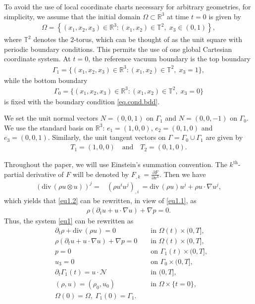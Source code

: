 \documentclass[12pt,twoside,reqno]{amsart}
\numberwithin{equation}{section}
\theoremstyle{definition}
\theoremstyle{remark}
\begin{document}
To avoid the use of local coordinate charts necessary for arbitrary geometries, for simplicity, we assume that the initial domain $\Omega\subset {\mathbb R}^3$ at time $t=0$ is given by
\begin{align*}
  \Omega=\left\{(x_1,x_2,x_3)\in{\mathbb R}^3 : (x_1,x_2)\in\mathbb{T}^2,\; x_3\in(0,1)\right\},
\end{align*}
where $\mathbb{T}^2$ denotes the $2$-torus, which can be thought of as the unit square with periodic boundary conditions. This permits the use of one global Cartesian coordinate system. At $t=0$, the reference vacuum boundary is the top boundary
\begin{align*}
  {\Gamma_1}=\{(x_1,x_2,x_3)\in{\mathbb R}^3 : (x_1,x_2)\in\mathbb{T}^2,\; x_3=1\},
\end{align*}
while the bottom boundary
\begin{align*}
  {\Gamma_0}=\{(x_1,x_2,x_3)\in{\mathbb R}^3 : (x_1,x_2)\in\mathbb{T}^2,\; x_3=0\}
\end{align*}
is fixed with the boundary condition \eqref{eq.cond.bdd}.

We set the unit normal vectors $N=(0,0,1)$ on $\Gamma_1$ and $N=(0,0,-1)$ on $\Gamma_0$.  We use the standard basis on $ \mathbb{R}^3  $: $e_1=(1,0,0)$, $e_2=(0,1,0)$ and $e_3=(0,0,1)$.  Similarly, the unit tangent vectors on $\Gamma=\Gamma_0\cup\Gamma_1$ are given by
 \begin{align*}
   T_1=(1,0,0) \quad \text{and} \quad T_2=(0,1,0).
 \end{align*}

Throughout the paper, we will use Einstein's summation convention. The $k^{\mathrm{th}}$-partial derivative of $F$ will be denoted by ${{{F}}_{,{k}}\,}=\frac{{\partial} F}{{\partial} x^k}$. Then we have
\begin{align*}
  ({\mathrm{div}\,}(\rho u\otimes u))^j=&{{{(\rho u^iu^j)}}_{,{i}}\,}={\mathrm{div}\,}(\rho u)u^j+\rho u\cdot{\nabla} u^j,
\end{align*}
which yields that \eqref{eu1.2} can be rewritten, in view of \eqref{eu1.1}, as
\begin{align*}
  \rho({\partial}_t u+u\cdot{\nabla} u)+{\nabla} p=0.
\end{align*}
Thus, the system \eqref{eu1} can be rewritten as
\begin{subequations}\label{eu2}
  \begin{align}
    &{\partial}_t\rho+{\mathrm{div}\,}(\rho u)=0  &&\text{ in } \Omega(t)\times(0,T],\label{eu2.1}\\
    &\rho({\partial}_t u+u\cdot{\nabla} u)+{\nabla} p=0 &&\text{ in } \Omega(t)\times(0,T], \label{eu2.2}\\
    &p=0\; &&\text{ on } {\Gamma_1}(t)\times(0,T],\label{eu2.6}\\
    &u_3=0\; &&\text{ on } {\Gamma_0}\times(0,T],\label{eu2.7}\\
    &\partial_t {\Gamma_1}(t)=u\cdot {\mathcal{N}} &&\text{ in } (0,T],\\
    &(\rho,u)=({\rho_0},u_0) &&\text{ in }\Omega\times \{t=0\},\\
    &\Omega(0)=\Omega,\; {\Gamma_1}(0)={\Gamma_1}.
\end{align}
\end{subequations}
\end{document}
